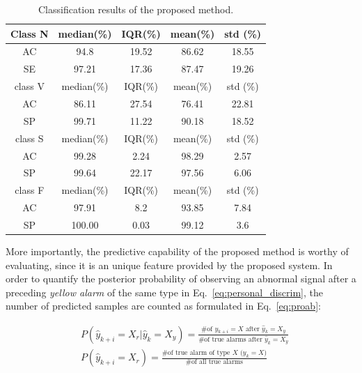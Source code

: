 \begin{table}[t]
	\caption{Classification results of the proposed method.}
	\centering
	\begin{tabular}{|c|c|c|c|c|}
		\hline
		Class N & median(\%) & IQR(\%) & mean(\%)& std (\%) \\ 
		\hline 
		AC & 94.8& 19.52 & 86.62 & 18.55\\ 
		\hline 
		SE & 97.21  & 17.36 & 87.47 &19.26 \\ 
		\hline 
		class V & median(\%) & IQR(\%) & mean(\%)& std (\%) \\ 
		\hline 
		AC & 86.11 & 27.54 & 76.41 & 22.81 \\ 
		\hline 
		SP & 99.71 & 11.22 & 90.18 & 18.52 \\ 
		\hline 
		class S & median(\%) & IQR(\%) & mean(\%)& std (\%)\\ 
		\hline 
		AC & 99.28 & 2.24& 98.29&2.57 \\ 
		\hline 
		SP & 99.64& 22.17& 97.56 & 6.06\\ 
		\hline 
		class F & median(\%) & IQR(\%) & mean(\%)& std (\%) \\ 
		\hline 
		AC & 97.91 & 8.2&93.85&7.84\\ 
		\hline 
		SP & 100.00 & 0.03&99.12&3.6\\ 
		\hline 
	\end{tabular} 
	\label{table:result1}
\end{table}


More importantly, the predictive capability of the proposed method is worthy of evaluating, since it is an unique feature provided by the proposed system. In order to quantify the posterior probability of observing an abnormal signal after a preceding \textit{yellow alarm} of the same type in Eq.~\ref{eq:personal_discrim}, the number of predicted samples are counted as formulated in Eq.~\ref{eq:proab}:

\begin{align}
\nonumber 
&P(\hat{y}_{k+i}=X_r|\hat{y}_{k}=X_y)=\frac{\text{\# of $y_{k+i}=X$ after $\hat{y}_k=X_y$}}{\text{\# of true alarms after $\hat{y}_k=X_y$}} \\
&P(\hat{y}_{k+i}=X_r)=\frac{\text{\# of true alarm of type $X$ ($y_{k}=X$)}}{\text{\# of all true alarms}} 
\label{eq:proab}
\end{align}

